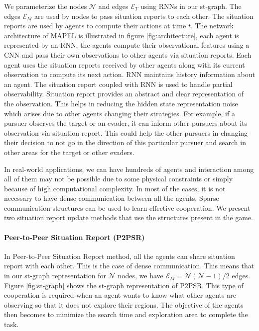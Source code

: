 \documentclass[conference]{IEEEtran}
\begin{document}
We parameterize the nodes $\mathcal{N}$ and edges $\mathcal{E}_T$ using RNNs in our st-graph. The edges $\mathcal{E}_M$ are used by nodes to pass situation reports to each other. The situation reports are used by agents to compute their actions at time $t$. The network architecture of MAPEL is illustrated in figure \ref{fig:architecture}, each agent is represented by an RNN, the agents compute their observational features using a CNN and pass their own observations to other agents via situation reports. Each agent uses the situation reports received by other agents along with its current observation to compute its next action. RNN maintains history information about an agent. The situation report coupled with RNN is used to handle partial observability. Situation report provides an abstract and clear representation of the observation. This helps in reducing the hidden state representation noise which arises due to other agents changing their strategies. For example, if a pursuer observes the target or an evader, it can inform other pursuers about its observation via situation report. This could help the other pursuers in changing their decision to not go in the direction of this particular pursuer and search in other areas for the target or other evaders.

In real-world applications, we can have hundreds of agents and interaction among all of them may not be possible due to some physical constraints or simply because of high computational complexity. In most of the cases, it is not necessary to have dense communication between all the agents. Sparse communication structures can be used to learn effective cooperation. We present two situation report update methods that use the structures present in the game.

\paragraph*{\textbf{Peer-to-Peer Situation Report (P2PSR)}}

In Peer-to-Peer Situation Report method, all the agents can share situation report with each other. This is the case of dense communication. This means that in our st-graph representation for $\mathcal{N}$ nodes, we have $\mathcal{E}_M=\mathcal{N}(\mathcal{N}-1)/2$ edges. Figure \ref{fig:st-graph} shows the st-graph representation of P2PSR. This type of cooperation is required when an agent wants to know what other agents are observing so that it does not explore their regions. The objective of the agents then becomes to minimize the search time and exploration area to complete the task.
\end{document}
